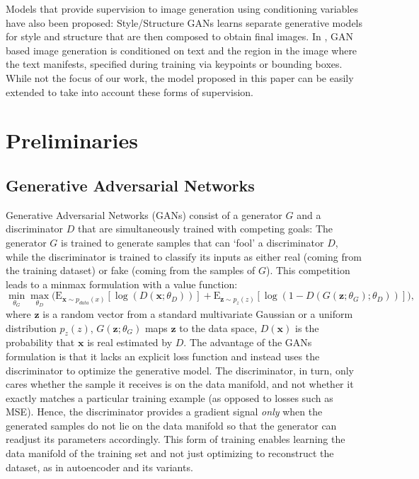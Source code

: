 \documentclass{article} \usepackage{iclr2017_conference,times}
\begin{document}
Models that provide supervision to image generation using conditioning variables have also been proposed: Style/Structure GANs \citep{StyleGAN} learns separate generative models for style and structure that are then composed to obtain final images. In \cite{WWGAN}, GAN based image generation is conditioned on text and the region in the image where the text manifests, specified during training via keypoints or bounding boxes. While not the focus of our work, the model proposed in this paper can be easily extended to take into account these forms of supervision.
%
 






\section{Preliminaries}

\subsection{Generative Adversarial Networks }
\label{sec:gan}
Generative Adversarial Networks (GANs) consist of a generator $G$ and a discriminator $D$ that 
are simultaneously trained with competing goals: The generator $G$ is trained to generate samples that can `fool' a discriminator $D$, while the discriminator is trained to classify its inputs as either real (coming from the training dataset) or fake (coming from the samples of $G$). This competition leads to a minmax formulation with a value function:
\begin{equation}
\min_{\theta_G} \max_{\theta_D} \Big( \mathrm{E}_{\bm{x} \sim p_{data}(x) }[\log(D(\bm{x}; \theta_D))] + \mathrm{E}_{\bm{z} \sim p_z(z)}[\log(1 - D(G(\bm{z}; \theta_G); \theta_D))] \Big),
\label{Eq_GAN}
\end{equation}
where $\bm{z}$ is a random vector from a standard multivariate Gaussian or a uniform distribution $p_z(z)$, $G(\bm{z}; \theta_G)$ maps $\bm{z}$ to the data space, $D(\bm{x})$ is the probability that $\bm{x}$ is real estimated by $D$. The advantage of the GANs formulation is that it lacks an explicit loss function and instead uses the discriminator to optimize the generative model. The discriminator, in turn, only cares whether the sample it receives is on the data manifold, and not whether it exactly matches a particular training example (as opposed to losses such as MSE). Hence, the discriminator provides a gradient signal \emph{only} when the generated samples do not lie on the data manifold so that the generator can readjust its parameters accordingly. This form of training enables learning the data manifold of the training set and not just optimizing to reconstruct the dataset, as in autoencoder and its variants.
\end{document}
